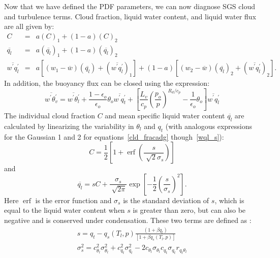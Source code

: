 Now that we have defined the PDF parameters, we can now diagnose SGS cloud and turbulence terms.  Cloud fraction, liquid water content, and liquid water flux are all given by:
%
\begin{eqnarray}
  C &=& a(C)_{1}+(1-a)(C)_{2} \label{turb_terms}\\
  \overline{q_{l}} &=& a(\overline{q_{l}})_{1}+(1-a)(\overline{q_{l}})_{2} \nonumber \\
  \overline{w^{'}q_{l}^{'}} &=& a[(w_{1}-\overline{w})(\overline{q_{l}})+(\overline{w^{'}q_{l}^{'}})_{1}]+(1-a)[(w_{2}-\overline{w})(\overline{q_{l}})_{2}+(\overline{w^{'}q_{l}^{'}})_{2}] . \nonumber
\end{eqnarray}
%
In addition, the buoyancy flux can be closed using the expression:
%
\begin{equation}
  \overline{w^{'}\theta_{v}^{'}}=\overline{w^{'}\theta_{l}^{'}}+\frac{1-\epsilon_{o}}{\epsilon_{o}}\theta_{o}\overline{w^{'}q_{t}^{'}}+\left[\frac{L_{v}}{c_{p}}\left(\frac{p_{o}}{p}\right)^{R_{d}/c_{p}}-\frac{1}{\epsilon_{o}}\theta_{o}\right]\overline{w^{'}q_{l}^{'}}
  \label{buoyancy}
\end{equation}
%
The individual cloud fraction $C$ and mean specific liquid water content $\overline{q_{l}}$ are calculated by linearizing the variability in $\theta_{l}$ and $q_{t}$ (with analogous expressions for the Gaussian 1 and 2 for equations~\ref{cld_fracadg} though~\ref{wql_s}): 
%
\begin{equation}
 C=\frac{1}{2}\left[1+\operatorname{erf}\left(\frac{s}{\sqrt[]{2}\sigma_{s}}\right)\right]
  \label{cld_fracadg}
\end{equation}
% 
and
% 
\begin{equation}
  \overline{q_{l}}=sC+\frac{\sigma_{s}}{\sqrt[]{2\pi}}\exp\left[-\frac{1}{2}\left(\frac{s}{\sigma_{s}}\right)^{2}\right].
  \label{ql_adg}
\end{equation}
%
Here $\operatorname{erf}$ is the error function and $\sigma_{s}$ is the standard deviation of $s$, which is equal to the liquid water content when $s$ is greater than zero, but can also be negative and is conserved under condensation.  These two terms are defined as \citep{Lewellen_Yoh93}:
%
\begin{equation}
  \begin{split}
    s=q_{t}-q_{s}(T_{l},p)\frac{(1+\beta q_{t})}{[1+\beta q_{s}(T_{l},p)]}\\
  \sigma_{s}^{2}=c_{\theta_{l}}^{2}\sigma_{\theta_{l}}^{2}+c_{q_{t}}^{2}\sigma_{q_{t}}^{2}-2c_{\theta_{l}}\sigma_{\theta_{l}}c_{q_{t}}\sigma_{q_{t}}r_{q_{t}\theta_{l}}
  \end{split}
  \label{sterms}
\end{equation}
